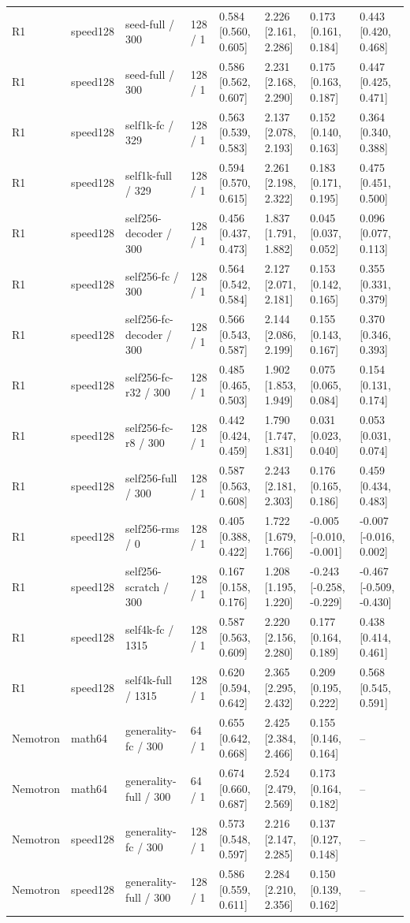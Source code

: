 \begin{tabular}{llllllll}
R1 & speed128 & seed-full / 300 & 128 / 1 & 0.584 [0.560, 0.605] & 2.226 [2.161, 2.286] & 0.173 [0.161, 0.184] & 0.443 [0.420, 0.468] \\
R1 & speed128 & seed-full / 300 & 128 / 1 & 0.586 [0.562, 0.607] & 2.231 [2.168, 2.290] & 0.175 [0.163, 0.187] & 0.447 [0.425, 0.471] \\
R1 & speed128 & self1k-fc / 329 & 128 / 1 & 0.563 [0.539, 0.583] & 2.137 [2.078, 2.193] & 0.152 [0.140, 0.163] & 0.364 [0.340, 0.388] \\
R1 & speed128 & self1k-full / 329 & 128 / 1 & 0.594 [0.570, 0.615] & 2.261 [2.198, 2.322] & 0.183 [0.171, 0.195] & 0.475 [0.451, 0.500] \\
R1 & speed128 & self256-decoder / 300 & 128 / 1 & 0.456 [0.437, 0.473] & 1.837 [1.791, 1.882] & 0.045 [0.037, 0.052] & 0.096 [0.077, 0.113] \\
R1 & speed128 & self256-fc / 300 & 128 / 1 & 0.564 [0.542, 0.584] & 2.127 [2.071, 2.181] & 0.153 [0.142, 0.165] & 0.355 [0.331, 0.379] \\
R1 & speed128 & self256-fc-decoder / 300 & 128 / 1 & 0.566 [0.543, 0.587] & 2.144 [2.086, 2.199] & 0.155 [0.143, 0.167] & 0.370 [0.346, 0.393] \\
R1 & speed128 & self256-fc-r32 / 300 & 128 / 1 & 0.485 [0.465, 0.503] & 1.902 [1.853, 1.949] & 0.075 [0.065, 0.084] & 0.154 [0.131, 0.174] \\
R1 & speed128 & self256-fc-r8 / 300 & 128 / 1 & 0.442 [0.424, 0.459] & 1.790 [1.747, 1.831] & 0.031 [0.023, 0.040] & 0.053 [0.031, 0.074] \\
R1 & speed128 & self256-full / 300 & 128 / 1 & 0.587 [0.563, 0.608] & 2.243 [2.181, 2.303] & 0.176 [0.165, 0.186] & 0.459 [0.434, 0.483] \\
R1 & speed128 & self256-rms / 0 & 128 / 1 & 0.405 [0.388, 0.422] & 1.722 [1.679, 1.766] & -0.005 [-0.010, -0.001] & -0.007 [-0.016, 0.002] \\
R1 & speed128 & self256-scratch / 300 & 128 / 1 & 0.167 [0.158, 0.176] & 1.208 [1.195, 1.220] & -0.243 [-0.258, -0.229] & -0.467 [-0.509, -0.430] \\
R1 & speed128 & self4k-fc / 1315 & 128 / 1 & 0.587 [0.563, 0.609] & 2.220 [2.156, 2.280] & 0.177 [0.164, 0.189] & 0.438 [0.414, 0.461] \\
R1 & speed128 & self4k-full / 1315 & 128 / 1 & 0.620 [0.594, 0.642] & 2.365 [2.295, 2.432] & 0.209 [0.195, 0.222] & 0.568 [0.545, 0.591] \\
Nemotron & math64 & generality-fc / 300 & 64 / 1 & 0.655 [0.642, 0.668] & 2.425 [2.384, 2.466] & 0.155 [0.146, 0.164] & -- \\
Nemotron & math64 & generality-full / 300 & 64 / 1 & 0.674 [0.660, 0.687] & 2.524 [2.479, 2.569] & 0.173 [0.164, 0.182] & -- \\
Nemotron & speed128 & generality-fc / 300 & 128 / 1 & 0.573 [0.548, 0.597] & 2.216 [2.147, 2.285] & 0.137 [0.127, 0.148] & -- \\
Nemotron & speed128 & generality-full / 300 & 128 / 1 & 0.586 [0.559, 0.611] & 2.284 [2.210, 2.356] & 0.150 [0.139, 0.162] & -- \\
\hline
\end{tabular}
